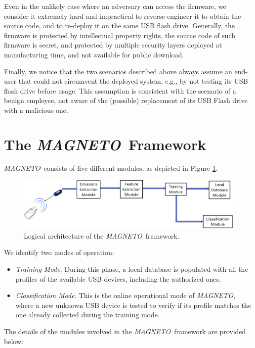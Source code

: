 \documentclass[acmsmall, authorversion]{acmart}
\newcommand{\sol}{\emph{MAGNETO}}
\begin{document}
Even in the unlikely case where an adversary can access the firmware, we consider it extremely hard and impractical to reverse-engineer it to obtain the source code, and to re-deploy it on the same USB flash drive. Generally, the firmware is protected by intellectual property rights, the source code of such firmware is secret, and protected by multiple security layers deployed at manufacturing time, and not available for public download.

Finally, we notice that the two scenarios described above always assume an end-user that could not circumvent the deployed system, e.g., by not testing its USB flash drive before usage. This assumption is consistent with the scenario of a benign employee, not aware of the (possible) replacement of its USB Flash drive with a malicious one.

\section{The \sol\ Framework}
\label{sec:idea}

\sol\ consists of five different modules, as depicted in Figure \ref{fig:sys}.

\begin{figure}[htbp!]
    \includegraphics[width=.5\columnwidth]{Figures/system.png}
    \centering
    \caption{Logical architecture of the \sol\ framework.}
    \label{fig:sys}
\end{figure}

We identify two modes of operation:
\begin{itemize}
    \item \emph{Training Mode.} During this phase, a local database is populated with all the profiles of the available USB devices, including the authorized ones.
    \item \emph{Classification Mode.} This is the online operational mode of \sol, where a new unknown USB device is tested to verify if its profile matches the one already collected during the training mode.
\end{itemize}

The details of the modules involved in the \sol\ framework are provided below:
\end{document}
